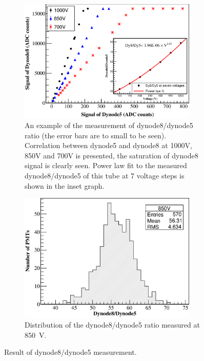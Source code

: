\documentclass{nst}
\begin{document}
\begin{figure}[!tb]

	\begin{subfigure}[t]{85mm}
		\includegraphics[width=85mm]{FIG8_a}
		\caption{An example of the measurement of dynode8/dynode5 ratio (the error bars are to small to be seen). Correlation between dynode5 and dynode8 at 1000V, 850V and 700V is presented, the saturation of dynode8 signal is clearly seen. Power law fit to the measured dynode8/dynode5 of this tube at 7 voltage steps is shown in the inset graph.}
		\label{fig:FIG8_a}
	\end{subfigure}
	\begin{subfigure}[t]{85mm}
		\includegraphics[width=85mm]{FIG8_b}
		\caption{Distribution of the dynode8/dynode5 ratio measured at \SI{850}{\volt}.}
		\label{fig:FIG8_b}
	\end{subfigure}

	\caption{Result of dynode8/dynode5 measurement.}
	\label{fig:FIG8}
\end{figure}
\end{document}
